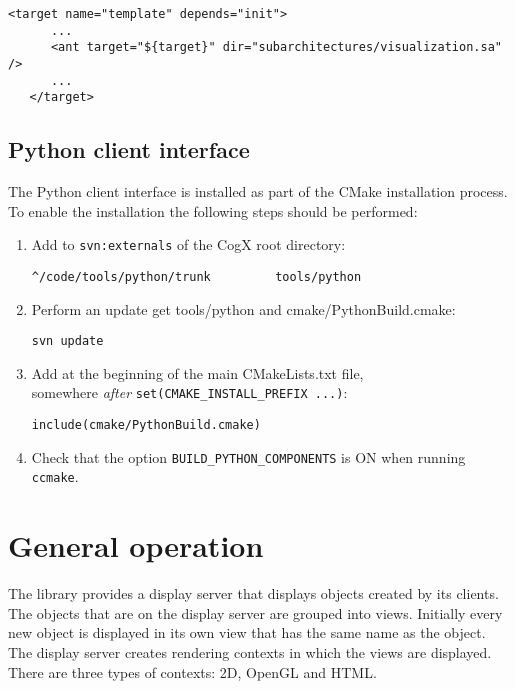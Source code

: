\begin{Verbatim}[fontsize=\scriptsize,gobble=3]
   <target name="template" depends="init">
      ...
      <ant target="${target}" dir="subarchitectures/visualization.sa" />
      ...
   </target>
\end{Verbatim}

\subsection{Python client interface}

The Python client interface is installed as part of the CMake installation
process. To enable the installation the following steps should be performed:

\begin{enumerate}
   \item Add to \verb|svn:externals| of the CogX root directory:

   \begin{Verbatim}[fontsize=\scriptsize,gobble=6]
      ^/code/tools/python/trunk         tools/python
   \end{Verbatim}

   \item Perform an update get tools/python and cmake/PythonBuild.cmake:

   \begin{Verbatim}[fontsize=\scriptsize,gobble=6]
      svn update
   \end{Verbatim}

   \item Add at the beginning of the main CMakeLists.txt file, \\
   somewhere {\em after} {\scriptsize \verb|set(CMAKE_INSTALL_PREFIX ...)|}:

   \begin{Verbatim}[fontsize=\scriptsize,gobble=6]
      include(cmake/PythonBuild.cmake)
   \end{Verbatim}

   \item Check that the option \verb|BUILD_PYTHON_COMPONENTS| is ON when
   running \verb|ccmake|.

\end{enumerate}

\section{General operation}

The library provides a display server that displays objects created by its
clients.  The objects that are on the display server are grouped into views.
Initially every new object is displayed in its own view that has the same name
as the object.
The display server creates rendering contexts in which the views are displayed.
There are three types of contexts: 2D, OpenGL and HTML.

